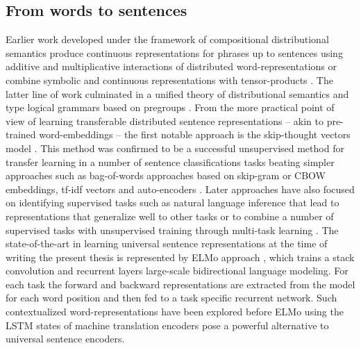 \subsection{From words to sentences}
Earlier work developed under the framework of compositional distributional semantics produce continuous representations for phrases up to sentences using additive and multiplicative interactions of distributed word-representations \cite{mitchell2008vector} or combine symbolic and continuous representations with tensor-products \cite{clark2007combining}. The latter line of work culminated in a unified theory of distributional semantics and type logical grammars based on pregroups \cite{coecke2010mathematical}.
From the more practical point of view of learning transferable distributed sentence representations -- akin to pre-trained word-embeddings -- the first notable approach is the skip-thought vectors model \cite{kiros2015skip}.
This method was confirmed to be a successful unsupervised method for transfer learning in a number of sentence classifications tasks beating simpler approaches such as bag-of-words approaches based on skip-gram or CBOW embeddings, tf-idf vectors and auto-encoders \cite{hill2016learning}.
Later approaches have also focused on identifying supervised tasks such as natural language inference \cite{conneau-EtAl:2017:EMNLP2017} that lead to representations that generalize well to other tasks or to combine a number of supervised tasks with unsupervised training through multi-task learning \cite{subramanian2018learning}. The state-of-the-art in learning universal sentence representations at the time of writing the present thesis is represented by ELMo approach \cite{peters2018deep}, which trains a stack convolution and recurrent layers large-scale bidirectional language modeling. For each task the forward and backward representations are extracted from the model for each word position and then fed to a task specific recurrent network. Such contextualized word-representations have been explored before ELMo using the LSTM states of machine translation encoders \cite{mccann2017learned} pose a powerful alternative to universal sentence encoders.


